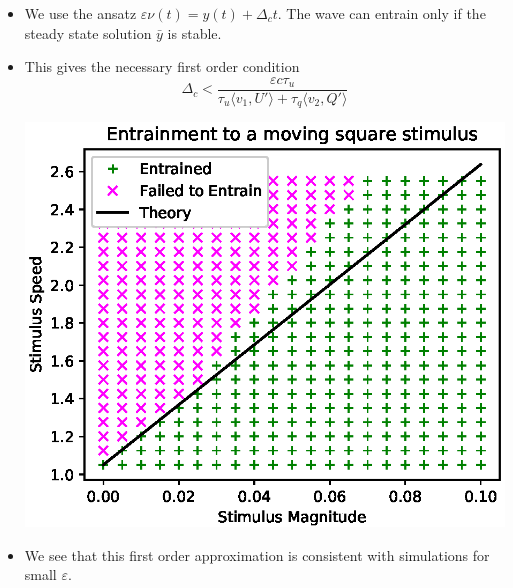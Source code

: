 \documentclass[landscape,final]{baposter}
\begin{document}
\begin{poster}
{\begin{itemize}
		\item We use the ansatz $\varepsilon \nu(t) = y(t) + \Delta_c t$. The wave can entrain only if the steady state solution $\bar{y}$ is stable.
		\item This gives the necessary first order condition
		$$
			\Delta_c < \frac{\varepsilon c \tau_u}{\tau_u \langle v_1, U' \rangle + \tau_q \langle v_2, Q' \rangle}
		$$
		\vspace{-.5cm}
		\begin{center}
			\includegraphics[width=.9\linewidth, trim={0cm, .0cm, 0cm, 0.4cm}, clip=true]{entrainment_square_contour}
		\end{center}
		\item We see that this first order approximation is consistent with simulations for small $\varepsilon$.
	\end{itemize}
}


\end{poster}
\end{document}
